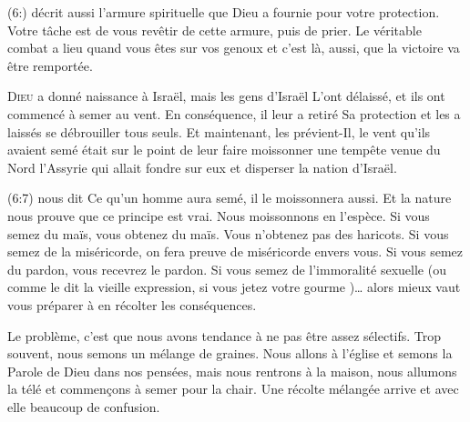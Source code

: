 (6:) décrit aussi l'armure spirituelle que Dieu
 a fournie pour votre protection. Votre tâche est de vous revêtir
 de cette armure, puis de prier. Le véritable combat a lieu
 quand vous êtes sur vos genoux et c'est là, aussi,
 que la victoire va être remportée. 

\dvrule







\lettrine{D}{ieu} a donné naissance à Israël, mais les gens d'Israël
 L'ont délaissé, et ils ont commencé à semer au vent.
 En conséquence, il leur a retiré Sa protection et les a laissés 
 se débrouiller tous seuls. Et maintenant, les prévient-Il,
 le vent qu'ils avaient semé était sur le point de leur faire moissonner
 une tempête venue du Nord
 \ocadr l'Assyrie qui allait fondre sur eux et disperser la nation d'Israël. 


(6:7) nous dit\frcolon{} 
 \Og Ce qu'un homme aura semé, il le moissonnera aussi. \Fg{}
 Et la nature nous prouve que ce principe est vrai.
 Nous moissonnons en l'espèce. Si vous semez du maïs, vous obtenez du maïs.
 Vous n'obtenez pas des haricots. Si vous semez de la miséricorde,
 on fera preuve de miséricorde envers vous. Si vous semez du pardon,
 vous recevrez le pardon. Si vous semez de l'immoralité sexuelle
 (ou comme le dit la vieille expression,
 \Og si vous jetez votre gourme \Fg{})\dots{}
 alors mieux vaut vous préparer à en récolter les conséquences. 

Le problème, c'est que nous avons tendance à ne pas être assez sélectifs.
 Trop souvent, nous semons un mélange de graines.
 Nous allons à l'église et semons la Parole de Dieu dans nos pensées,
 mais nous rentrons à la maison, nous allumons la télé et commen\c{c}ons à semer
 pour la chair. Une récolte mélangée arrive et avec elle beaucoup de confusion. 

